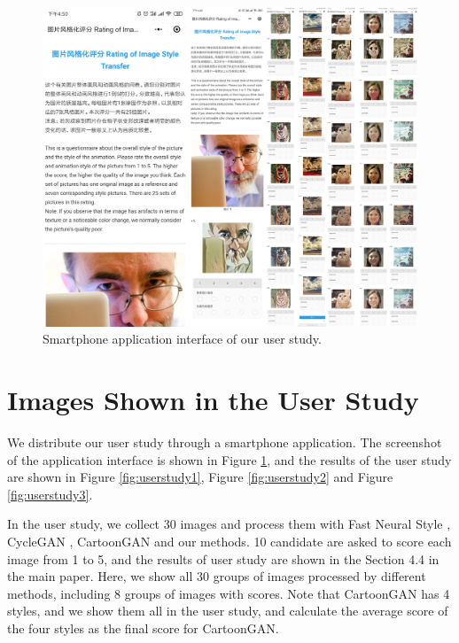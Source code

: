 \documentclass[10pt,twocolumn,letterpaper]{article}
\begin{document}
\begin{figure}[t]
\centering
\includegraphics[width=\linewidth]{figures/userstudy_interface.pdf}
\caption{Smartphone application interface of our user study.}
\label{fig:userstudy_interface}
\end{figure}

\vspace{-0.3em}
\section{Images Shown in the User Study}
\vspace{-0.3em}
We distribute our user study through a smartphone application. The screenshot of the application interface is shown in Figure \ref{fig:userstudy_interface}, and the results of the user study are shown in Figure \ref{fig:userstudy1},  Figure \ref{fig:userstudy2} and  Figure \ref{fig:userstudy3}.

In the user study, we collect 30 images and process them with Fast Neural Style \cite{johnson2016perceptual}, CycleGAN \cite{CycleGAN2017}, CartoonGAN \cite{chen2018cartoongan} and our methods. 10 candidate are asked to score each image from 1 to 5, and the results of user study are shown in the Section 4.4 in the main paper. Here, we show all 30 groups of images processed by different methods, including 8 groups of images with scores. Note that CartoonGAN has 4 styles, and we show them all in the user study, and calculate the average score of the four styles as the final score for CartoonGAN.
\end{document}
